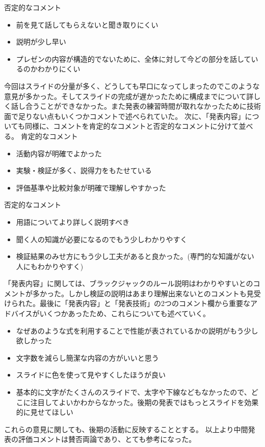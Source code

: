否定的なコメント
\begin{itemize}
\item 前を見て話してもらえないと聞き取りにくい
\item 説明が少し早い
\item プレゼンの内容が構造的でないために、全体に対して今どの部分を話しているのかわかりにくい
\end{itemize}

今回はスライドの分量が多く、どうしても早口になってしまったのでこのような意見が多かった。そしてスライドの完成が遅かったために構成までについて詳しく話し合うことができなかった。また発表の練習時間が取れなかったために技術面で足りない点もいくつかコメントで述べられていた。
次に、「発表内容」についても同様に、コメントを肯定的なコメントと否定的なコメントに分けて並べる。
肯定的なコメント
\begin{itemize}
\item 活動内容が明確でよかった
\item 実験・検証が多く、説得力をもたせている
\item 評価基準や比較対象が明確で理解しやすかった
\end{itemize}

否定的なコメント
\begin{itemize}
\item 用語についてより詳しく説明すべき
\item 聞く人の知識が必要になるのでもう少しわかりやすく
\item 検証結果のみせ方にもう少し工夫があると良かった。(専門的な知識がない人にもわかりやすく)
\end{itemize}

「発表内容」に関しては、ブラックジャックのルール説明はわかりやすいとのコメントが多かった。しかし検証の説明はあまり理解出来ないとのコメントも見受けられた。最後に「発表内容」と「発表技術」の2つのコメント欄から重要なアドバイスがいくつかあったため、これらについても述べていく。　
\begin{itemize}
\item なぜあのような式を利用することで性能が表されているかの説明がもう少し欲しかった
\item 文字数を減らし簡潔な内容の方がいいと思う
\item スライドに色を使って見やすくしたほうが良い
\item 基本的に文字がたくさんのスライドで、太字や下線などもなかったので、どこに注目してよいかわからなかった。後期の発表ではもっとスライドを効果的に見せてほしい
\end{itemize}
これらの意見に関しても、後期の活動に反映することとする。
以上より中間発表の評価コメントは賛否両論であり、とても参考になった。
